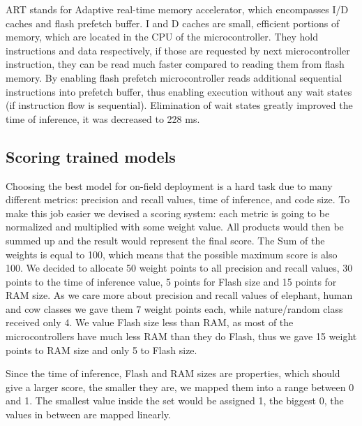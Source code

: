 ART stands for Adaptive real-time memory accelerator, which encompasses I/D caches and flash prefetch buffer.
I and D caches are small, efficient portions of memory, which are located in the CPU of the microcontroller.
They hold instructions and data respectively, if those are requested by next microcontroller instruction, they can be read much faster compared to reading them from flash memory. 
By enabling flash prefetch microcontroller reads additional sequential instructions into prefetch buffer, thus enabling execution without any wait states (if instruction flow is sequential).
Elimination of wait states greatly improved the time of inference, it was decreased to 228 \si{\milli\second}.


\subsection{ Scoring trained models}

Choosing the best model for on-field deployment is a hard task due to many different metrics: precision and recall values, time of inference, and code size.
To make this job easier we devised a scoring system: each metric is going to be normalized and multiplied with some weight value.
All products would then be summed up and the result would represent the final score.
The Sum of the weights is equal to 100, which means that the possible maximum score is also 100.
We decided to allocate 50 weight points to all precision and recall values, 30 points to the time of inference value, 5 points for Flash size and 15 points for RAM size.
As we care more about precision and recall values of elephant, human and cow classes we gave them 7 weight points each, while nature/random class received only 4.
We value Flash size less than RAM, as most of the microcontrollers have much less RAM than they do Flash, thus we gave 15 weight points to RAM size and only 5 to Flash size.

Since the time of inference, Flash and RAM sizes are properties, which should give a larger score, the smaller they are, we mapped them into a range between 0 and 1.
The smallest value inside the set would be assigned 1, the biggest 0, the values in between are mapped linearly.

